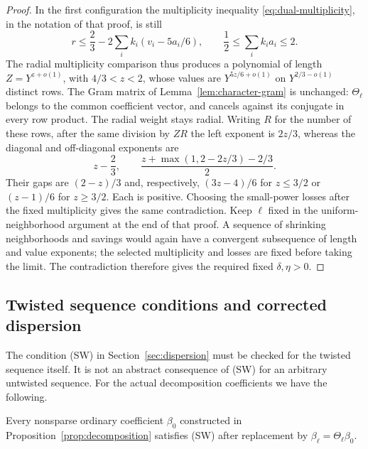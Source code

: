 \begin{proof}
In the first configuration the multiplicity inequality
\eqref{eq:dual-multiplicity}, in the notation of that proof, is still
\[
 r\le\frac23-2\sum_i k_i(v_i-5a_i/6),
 \qquad \frac12\le\sum_i k_i a_i\le2.
\]
The radial multiplicity comparison thus produces a polynomial of
length $Z=Y^{z+o(1)}$, with $4/3<z<2$, whose values are
$Y^{5z/6+o(1)}$ on $Y^{2/3-o(1)}$ distinct rows.
The Gram matrix of Lemma~\ref{lem:character-gram} is unchanged:
$\Theta_\ell$ belongs to the common coefficient vector, and cancels
against its conjugate in every row product. The radial weight stays
radial. Writing $R$ for the number of these rows, after the same
division by $ZR$ the left exponent is
$2z/3$, whereas the diagonal and off-diagonal exponents are
\[
 z-\frac23,\qquad
 \frac{z+\max(1,2-2z/3)-2/3}{2}.
\]
Their gaps are $(2-z)/3$ and, respectively, $(3z-4)/6$ for
$z\le3/2$ or $(z-1)/6$ for $z\ge3/2$. Each is positive.
Choosing the small-power losses after the fixed multiplicity gives
the same contradiction. Keep $\ell$ fixed in the uniform-neighborhood
argument at the end of that proof. A sequence of shrinking
neighborhoods and savings would again have a convergent subsequence
of length and value exponents; the selected multiplicity and losses
are fixed before taking the limit. The contradiction therefore gives
the required fixed $\delta,\eta>0$.
\end{proof}

\subsection{Twisted sequence conditions and corrected dispersion}

The condition \textup{(SW)} in Section~\ref{sec:dispersion} must
be checked for the twisted sequence itself. It is not an abstract
consequence of \textup{(SW)} for an arbitrary untwisted sequence.
For the actual decomposition coefficients we have the following.

\begin{lemma}
\label{lem:angular-sw}
Every nonsparse ordinary coefficient $\beta_0$ constructed in
Proposition~\ref{prop:decomposition} satisfies \textup{(SW)}
after replacement by $\beta_\ell=\Theta_\ell\beta_0$.
\end{lemma}

